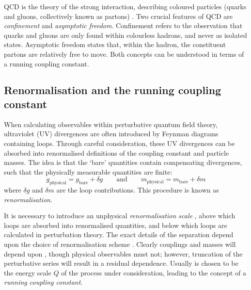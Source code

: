 
\ac{QCD} is the theory of the strong interaction, describing coloured particles (quarks 
and gluons, collectively known as partons) \cite{Ellis:1996}. Two crucial features of 
\ac{QCD} are \textit{confinement} and \textit{asymptotic freedom}. Confinement refers to 
the observation that quarks and gluons are only found within colourless hadrons, and 
never as isolated states. Asymptotic freedom states that, within the hadron, the 
constituent partons are relatively free to move. Both concepts can be understood in terms 
of a running coupling constant.



\subsection{Renormalisation and the running coupling constant}
\label{sec:qcd:renormalisation}

When calculating observables within perturbative quantum field theory, ultraviolet (UV) 
divergences are often introduced by Feynman diagrams containing loops. Through careful 
consideration, these UV divergences can be absorbed into renormalised definitions of the 
coupling constant and particle masses. The idea is that the `bare' quantities contain 
compensating divergences, such that the physically measurable quantities are finite:
\begin{equation}
	g_{\text{physical}} = g_{\text{bare}} + \delta g
	\quad\quad\text{and}\quad\quad
	m_{\text{physical}} = m_{\text{bare}} + \delta m
\end{equation}
where $\delta g$ and $\delta m$ are the loop contributions. This procedure is known as 
\textit{renormalisation}.

It is necessary to introduce an unphysical \textit{renormalisation scale} \mur, above 
which loops are absorbed into renormalised quantities, and below which loops are 
calculated in perturbation theory. The exact details of the separation depend upon the 
choice of renormalisation scheme \cite{Aitchison}. Clearly couplings and masses will 
depend upon \mur, though physical observables must not; however, truncation of the 
perturbative series will result in a residual \mur dependence. Usually \mur is chosen to 
be the energy scale $Q$ of the process under consideration, leading to the concept of a 
\textit{running coupling constant}.

